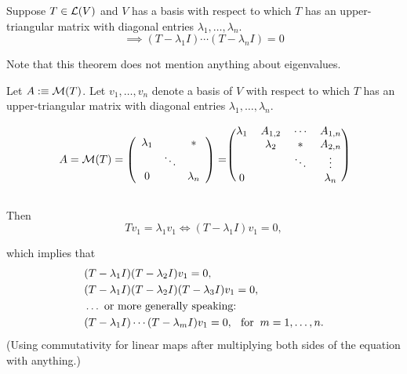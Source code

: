 \begin{thm}
  \label{thm: equation satisfied by operator with upper triangular matrix}
  Suppose $T\in \mathcal{L}(V)$ and $V$ has a basis with respect to which $T$ has an upper-triangular matrix with diagonal entries $\lambda_1, \dots, \lambda_n$.
  \begin{equation}
    \implies (T-\lambda_1I) \cdots (T-\lambda_nI)=0
  \end{equation}

  Note that this theorem does not mention anything about eigenvalues.
\end{thm}
\begin{prf}
  Let $A :\equiv \mathcal{M}(T)$. Let $v_1, \ldots, v_n$ denote a basis of $V$ with respect to which $T$  has an upper-triangular matrix with diagonal entries $\lambda_1, \ldots, \lambda_n$.

  \begin{minipage}{\linewidth}
  \begin{equation}
    A = \mmatrix(T)
    =
    \left( {\begin{array}{ccc}
        \lambda_1 &         &  * \\
                  &  \ddots &    \\
        0         &         & \lambda_n
    \end{array} } \right)
    =
    \begin{blockarray}{(cccc)}
       \lambda_1&  A_{1,2}  &  \cdots &  A_{1,n} \\
                & \lambda_2 &     *   &  A_{2,n} \\
                &           &  \ddots &  \vdots  \\
          0     &           &         & \lambda_n
    \end{blockarray}
  \end{equation}
  \end{minipage}

  Then
  \begin{equation}
    \label{i-need-a-ref}
    T v_1 = \lambda_1 v_1 \iff (T-\lambda_1 I)  v_1 = 0,
  \end{equation}

  which implies that
  \begin{equation}
\begin{aligned}
    &(T-\lambda_1 I)(T-\lambda_2 I)  v_1 =0, \\
    &(T-\lambda_1 I)(T-\lambda_2 I)(T-\lambda_3 I)  v_1 =0, \\
    &\ldots \text{ or more generally speaking:} \\
    &(T-\lambda_1 I) \cdots (T-\lambda_m I) v_1 = 0,
     \;\;\, \text{for}\;\; m = 1, \ldots, n.
\end{aligned}
  \end{equation}
  (Using commutativity for linear maps after multiplying both sides of the equation with anything.)
  \bigbreak


\end{prf}
